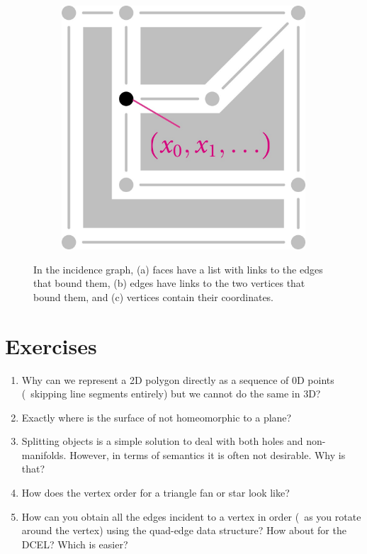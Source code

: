 \begin{figure}
\begin{subfigure}[b]{0.27\linewidth}
\caption{}%
\label{subfig:1-cell-boundary}
\end{subfigure}
\quad
\begin{subfigure}[b]{0.27\linewidth}
\includegraphics[width=\linewidth]{figs/0-cell-embedding}
\caption{}%
\label{subfig:0-cell-embedding}
\end{subfigure}
\caption{In the incidence graph, (a) faces have a list with links to the edges that bound them, (b) edges have links to the two vertices that bound them, and (c) vertices contain their coordinates.}%
\label{fig:incidencegraph}
\end{figure}

%
\section{Exercises}

\begin{enumerate}
	\item Why can we represent a 2D polygon directly as a sequence of 0D points (\ie\ skipping line segments entirely) but we cannot do the same in 3D\@?
	\item Exactly where is the surface of  not homeomorphic to a plane?
	\item Splitting objects is a simple solution to deal with both holes and non-manifolds. However, in terms of semantics it is often not desirable. Why is that?
	\item How does the vertex order for a triangle fan or star look like?
	\item How can you obtain all the edges incident to a vertex in order (\ie\ as you rotate around the vertex) using the quad-edge data structure? How about for the DCEL\@? Which is easier?
\end{enumerate}



